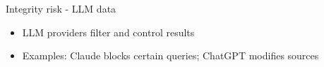 \documentclass[pdf,aspectratio=169]{beamer}
\begin{document}
\begin{frame}{Integrity risk - LLM data}
  \begin{itemize}
  \item LLM providers filter and control results
  \item Examples: Claude blocks certain queries; ChatGPT modifies sources
  \end{itemize}

  \hfill
\end{frame}
\end{document}
